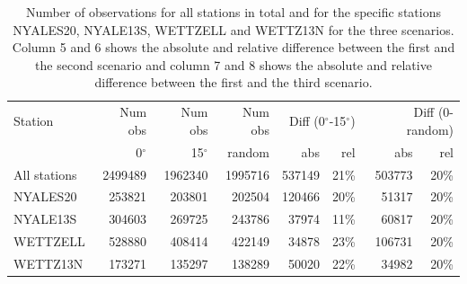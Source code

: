 \documentclass[twoside=semi,fontsize=12pt,paper=a4,titlepage=on]{kv_article}
\begin{document}
% 

\begin{table}[t]
	\begin{tabularx}{\linewidth}{X|r|r|r|r|r|r|r}
	Station      & Num obs   & Num obs    & Num obs & \multicolumn{2}{r|}{Diff (0$^\circ$-15$^\circ$)} & \multicolumn{2}{r}{Diff (0-random)} \\
	             & 0$^\circ$ & 15$^\circ$ & random  & abs & rel & abs & rel\\
	\hline
	All stations & 2499489   & 1962340    & 1995716 & 537149 & 21\% & 503773 & 20\% \\
	NYALES20     & 253821    & 203801     & 202504  & 120466 & 20\% & 51317  & 20\% \\
	NYALE13S     & 304603    & 269725     & 243786  & 37974  & 11\% & 60817  & 20\% \\
	WETTZELL     & 528880    & 408414     & 422149  & 34878  & 23\% & 106731 & 20\% \\
	WETTZ13N     & 173271    & 135297     & 138289  & 50020  & 22\% & 34982  & 20\%  \\
	\hline
	\end{tabularx}
\caption{{Number of observations for all stations in total and for the specific stations NYALES20, NYALE13S, WETTZELL and WETTZ13N for the three scenarios.
	Column 5 and 6 shows the absolute and relative difference between the first and the second scenario and column 7 and 8 shows the absolute and relative
	difference between the first and the third scenario. }}
\label{tab:num_obs}
\end{table}
\end{document}
